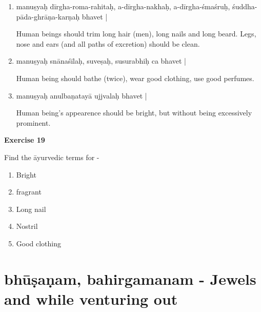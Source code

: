 \begin{enumerate}
\item {}

manuṣyaḥ dīrgha-roma-rahitaḥ, a-dīrgha-nakhaḥ, a-dīrgha-śmaśruḥ, śuddha-pāda-ghrāṇa-karṇaḥ bhavet | 

Human beings should trim long hair (men), long nails and long beard. Legs, nose and ears (and all paths of excretion) should be clean.   

\item {}

manuṣyaḥ snānaśīlaḥ, suveṣaḥ, susurabhiḥ ca bhavet |

Human being should bathe (twice), wear good clothing, use good perfumes.   

\item {}

manuṣyaḥ anulbaṇatayā ujjvalaḥ bhavet |

Human being’s appearence should be bright, but without being excessively prominent.
\end{enumerate}

\begin{center}
\textbf{\large Exercise 19}
\end{center}

Find the āyurvedic terms for -
\begin{enumerate}
\renewcommand{\theenumi}{\alph{enumi}}
\renewcommand{\labelenumi}{\theenumi.}
\item Bright
\item fragrant
\item Long nail
\item Nostril
\item Good clothing
\end{enumerate}

\chapter{bhūṣaṇam, bahirgamanam - Jewels and while venturing out}

